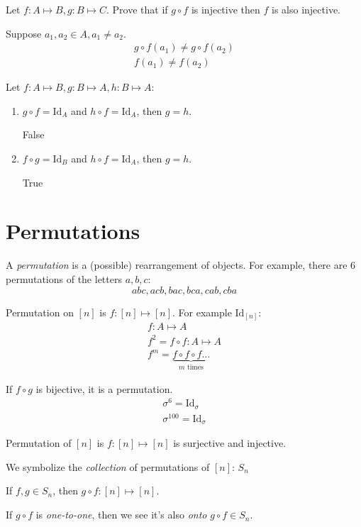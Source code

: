 \documentclass[00_complete]{subfiles}
\begin{document}
\begin{example}
Let $f: A \mapsto B, g: B \mapsto C$. Prove that if $g \circ f$ is injective
then $f$ is also injective.

Suppose $a_1, a_2 \in A, a_1 \neq a_2$.
\begin{gather*}
g \circ f(a_1) \neq g \circ f(a_2) \\
f(a_1) \neq f(a_2)
\end{gather*}
\end{example}

\begin{example}
Let $f: A \mapsto B, g: B \mapsto A, h: B \mapsto A$:

\begin{enumerate}
\item $g \circ f = \mathrm{Id}_A$ and $h \circ f = \mathrm{Id}_A$, then $g=h$.

False
\item $f \circ g = \mathrm{Id}_B$ and $h \circ f = \mathrm{Id}_A$, then $g=h$.

True
\end{enumerate}
\end{example}

\section{Permutations}

A \emph{permutation} is a (possible) rearrangement of objects. For example,
there are 6 permutations of the letters $a, b, c$:
$$abc, acb, bac, bca, cab, cba$$

Permutation on $[n]$ is $f: [n] \mapsto [n]$. For example $\mathrm{Id}_{[n]}$:
\begin{gather*}
    f: A \mapsto A \\
    f^2 = f \circ f: A \mapsto A \\
    f^m = \underbrace{f \circ f \circ f \ldots}_{m \text{ times}}
\end{gather*}

If $f \circ g$ is bijective, it is a permutation.
\begin{gather*}
\sigma^6 = \mathrm{Id}_{\sigma} \\
\sigma^{100} = \mathrm{Id}_{\sigma}
\end{gather*}

\begin{definition}[Permutation]
Permutation of $[n]$ is $f: [n] \mapsto [n]$ is surjective and injective.

We symbolize the \emph{collection} of permutations of $[n]$: $S_n$

If $f, g \in S_n$, then $g \circ f: [n] \mapsto [n]$.

If $g \circ f$ is \emph{one-to-one}, then we see it's also \emph{onto} $g \circ
f \in S_n$.

\end{definition}
\end{document}
